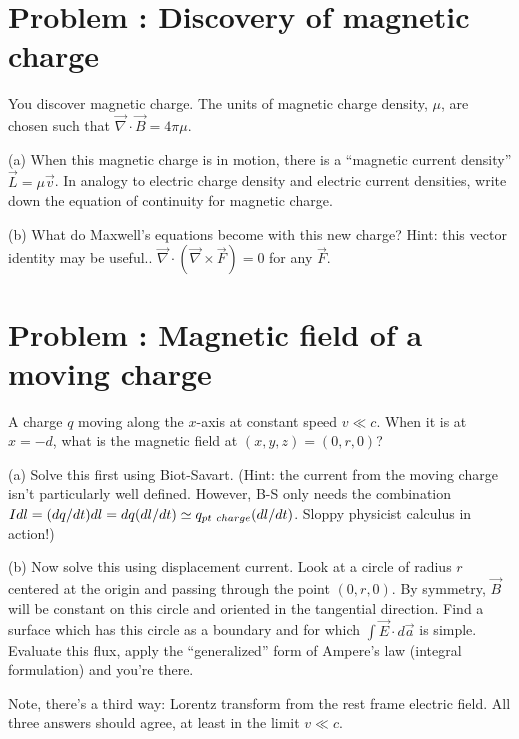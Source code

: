 \documentclass[problems]{esg8022pset}
\date{\today }
\begin{document}
\section{Problem \thesection: Discovery of magnetic charge}
You discover magnetic
charge.  The units of magnetic charge density,
$\mu$, are chosen such that $\vec\nabla\cdot\vec B = 4\pi\mu$.

\par\noindent (a) When this magnetic charge is in motion,
there is a ``magnetic current density'' $\vec {L} = \mu \vec{ v}$.  In
analogy to electric charge density and electric current densities,
write down the equation of continuity for magnetic charge.

\par\noindent (b) What do Maxwell's equations become with this
new charge? Hint: this vector identity may be useful.. $\vec\nabla\cdot(\vec{\nabla}\times\vec{F})=0$ for any $\vec{F}$.
\section{Problem \thesection:  Magnetic field of a moving charge}
A charge $q$ moving
along the $x$-axis at constant speed $v \ll c$.  When it is at $x =
-d$, what is the magnetic field at $(x,y,z) = (0,r,0)$?

\par\noindent (a)  Solve this first using Biot-Savart.  (Hint:
the current from the moving charge isn't particularly well defined.
However, B-S only needs the combination $I dl = (dq/dt) dl = dq
(dl/dt) \simeq q_{\rm pt\ charge}(dl/dt)$.  Sloppy physicist calculus
in action!)

\par\noindent (b)  Now solve this using displacement current.
Look at a circle of radius $r$ centered at the origin and passing
through the point $(0,r,0)$.  By symmetry, $\vec B$ will be constant
on this circle and oriented in the tangential direction.  Find a
surface which has this circle as a boundary and for which $\int \vec
E\cdot d\vec a$ is simple.  Evaluate this flux, apply the
``generalized'' form of Ampere's law (integral formulation) and you're
there.

\par\noindent Note, there's a third way: Lorentz transform from the
rest frame electric field.  All
three answers should agree, at least in the limit $v \ll c$.
\end{document}
